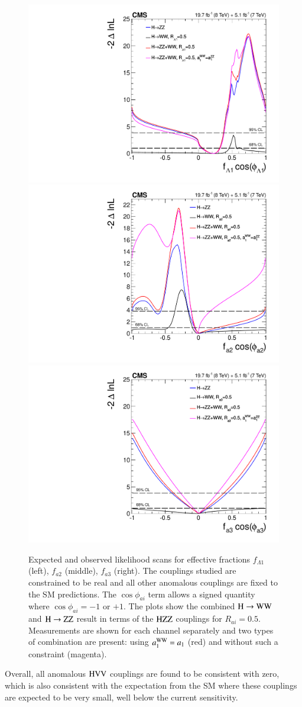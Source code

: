 \begin{figure}[!p]
  \begin{center} 
    \includegraphics[width=0.31\linewidth]{figures/flambda1_combine_ww.pdf}
    \includegraphics[width=0.31\linewidth]{figures/fa2_combine_ww.pdf}
    \includegraphics[width=0.31\linewidth]{figures/fa3_combine_ww.pdf}
    \caption{
      Expected and observed likelihood scans for effective fractions 
      $f_{\Lambda1}$ (left), $f_{a2}$ (middle), $f_{a3}$ (right). 
      The couplings studied are constrained to be real and all other anomalous couplings are fixed to the SM predictions. 
      The $\cos\phi_{ai}$ term allows a signed quantity where $\cos\phi_{ai}=-1$ or $+1$.
      The plots show the combined  $\mathrm{H}\to\mathrm{W}\mathrm{W}$ and $\mathrm{H}\to\mathrm{Z}\mathrm{Z}$ result in terms of the $\mathrm{H}\mathrm{Z}\mathrm{Z}$ couplings for $R_{ai} = 0.5$. 
      Measurements are shown for each channel separately and two types of combination are present:
      using $a_1^{\mathrm{W}\mathrm{W}} = a_1$ (red) and without such a constraint (magenta).
    \label{fig:hwwscans}
    }
  \end{center}
\end{figure}

%
Overall, all anomalous $\mathrm{H}\mathrm{V}\mathrm{V}$ couplings are found to be consistent
with zero, which is also consistent with the expectation from the SM
where these couplings are expected to be very small, well below the
current sensitivity.
